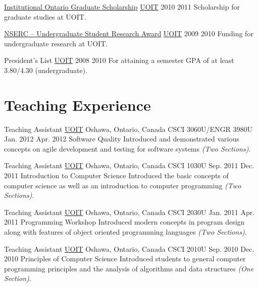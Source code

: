   \honorsAwardsEntry
    {\href{http://gradstudies.uoit.ca/test/EN/main/future\_students/awards\_and\_funding/external\_awards/OGSInstitutional.html}{Institutional Ontario
Graduate Scholarship}}
    {\href{http://uoit.ca/}{UOIT}}
    {2010}
    {2011}
    {Scholarship for graduate studies at UOIT.}

  \honorsAwardsEntry
    {\href{http://www.nserc-crsng.gc.ca/students-etudiants/ug-pc/usra-brpc_eng.asp}{NSERC -- Undergraduate Student Research Award}}
    {\href{http://uoit.ca/}{UOIT}}
    {2009}
    {2010}
    {Funding for undergraduate research at UOIT.}

  \honorsAwardsEntry
    {President's List}
    {\href{http://uoit.ca/}{UOIT}}
    {2008}
    {2010}
    {For attaining a semester GPA of at least 3.80/4.30 (undergraduate).}

  \section{Teaching Experience}

  \teachingEntry
    {Teaching Assistant}
    {\href{http://www.uoit.ca/}{UOIT}}
    {Oshawa, Ontario, Canada}
    {CSCI 3060U/ENGR 3980U}
    {Jan. 2012}
    {Apr. 2012}
    {Software Quality}
    {Introduced and demonstrated various concepts on agile development and testing for software systems \textit{(Two Sections)}.}

  \teachingEntry
    {Teaching Assistant}
    {\href{http://www.uoit.ca/}{UOIT}}
    {Oshawa, Ontario, Canada}
    {CSCI 1030U}
    {Sep. 2011}
    {Dec. 2011}
    {Introduction to Computer Science}
    {Introduced the basic concepts of computer science as well as an introduction to computer programming \textit{(Two Sections)}.}

  \teachingEntry
    {Teaching Assistant}
    {\href{http://www.uoit.ca/}{UOIT}}
    {Oshawa, Ontario, Canada}
    {CSCI 2030U}
    {Jan. 2011}
    {Apr. 2011}
    {Programming Workshop}
    {Introduced modern concepts in program design along with features of object oriented programming languages \textit{(Two Sections)}.}

  \teachingEntry
    {Teaching Assistant}
    {\href{http://www.uoit.ca/}{UOIT}}
    {Oshawa, Ontario, Canada}
    {CSCI 2010U}
    {Sep. 2010}
    {Dec. 2010}
    {Principles of Computer Science}
    {Introduced students to general computer programming principles and the analysis of algorithms and data structures \textit{(One Section)}.}

